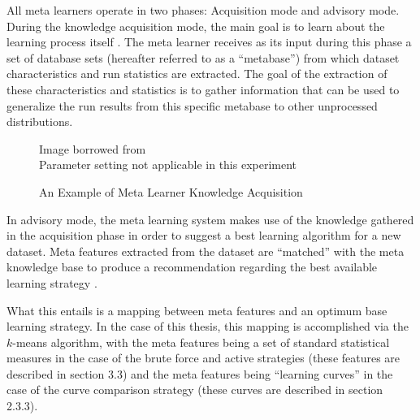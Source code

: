 All meta learners operate in two phases: Acquisition mode and advisory mode.
During the knowledge acquisition mode, the main goal is to learn about the
learning process itself \cite{Vilalta}. The meta learner receives as its input
during this phase a set of database sets (hereafter referred to as a ``metabase'')
from which dataset characteristics and run statistics are extracted. The goal
of the extraction of these characteristics and statistics is to gather
information that can be used to generalize the run results from this specific
metabase to other unprocessed distributions.

\begin{figure}[h]
\caption{An Example of Meta Learner Knowledge Acquisition}
\centering
Image borrowed from \cite{Vilalta} \\
Parameter setting not applicable in this experiment
\end{figure}

In advisory mode, the meta learning system makes use of the knowledge gathered in
the acquisition phase in order to suggest a best learning algorithm for a new
dataset. Meta features extracted from the dataset are ``matched'' with the
meta knowledge base to produce a recommendation regarding the best available
learning strategy \cite{Vilalta}.

What this entails is a mapping between meta features and an optimum base learning
strategy. In the case of this thesis, this mapping is accomplished via the $k$-means
algorithm, with the meta features being a set of standard statistical measures
in the case of the brute force and active strategies (these features are described
in section 3.3) and the meta features being ``learning curves'' in the case of the
curve comparison strategy (these curves are described in section 2.3.3).

